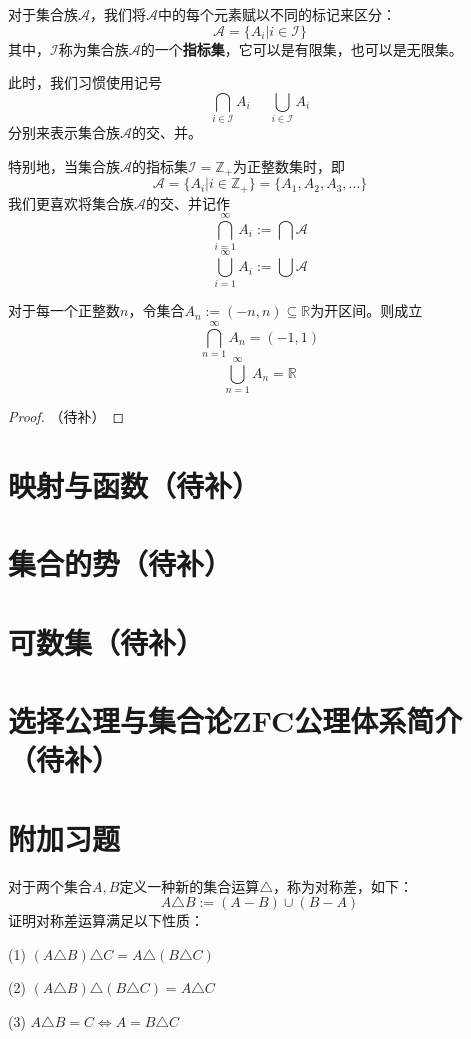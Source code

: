对于集合族$\mathcal{A}$，我们将$\mathcal{A}$中的每个元素赋以不同的标记来区分：
$$\mathcal{A}=\{A_i|i\in\mathcal{I}\}$$
其中，$\mathcal{I}$称为集合族$\mathcal{A}$的一个\textbf{指标集}，它可以是有限集，也可以是无限集。

此时，我们习惯使用记号
$$\bigcap_{i\in\mathcal{I}}A_i\,\,\,\,\,\,\,\,\bigcup_{i\in\mathcal{I}}A_i$$
分别来表示集合族$\mathcal{A}$的交、并。

特别地，当集合族$\mathcal{A}$的指标集$\mathcal{I}=\mathbb{Z_+}$为正整数集时，即
$$\mathcal{A}=\{A_i|i\in\mathbb{Z}_+\}=\{A_1,A_2,A_3,...\}$$
我们更喜欢将集合族$\mathcal{A}$的交、并记作
$$\bigcap_{i=1}^{\infty}A_i:=\bigcap\mathcal{A}$$
$$\bigcup_{i=1}^{\infty}A_i:=\bigcup\mathcal{A}$$

\begin{example}
对于每一个正整数$n$，令集合$A_n:=(-n,n)\subseteq\mathbb{R}$为开区间。则成立
$$\bigcap_{n=1}^\infty A_n=(-1,1)$$
$$\bigcup_{n=1}^\infty A_n=\mathbb{R}$$
\end{example}
\begin{proof}
（待补）
\end{proof}

\section{映射与函数（待补）}
\section{集合的势（待补）}
\section{可数集（待补）}
\section{选择公理与集合论ZFC公理体系简介（待补）}
\section{附加习题}

\begin{prob}[集合的对称差]

对于两个集合$A,B$定义一种新的集合运算$\triangle$，称为对称差，如下：
$$A\triangle B:=(A-B)\cup(B-A)$$
证明对称差运算满足以下性质：

(1) $(A\triangle B)\triangle C=A\triangle(B\triangle C)$

(2) $(A\triangle B)\triangle (B\triangle C)=A\triangle C$

(3) $A\triangle B=C\Leftrightarrow A=B\triangle C$
\end{prob}
